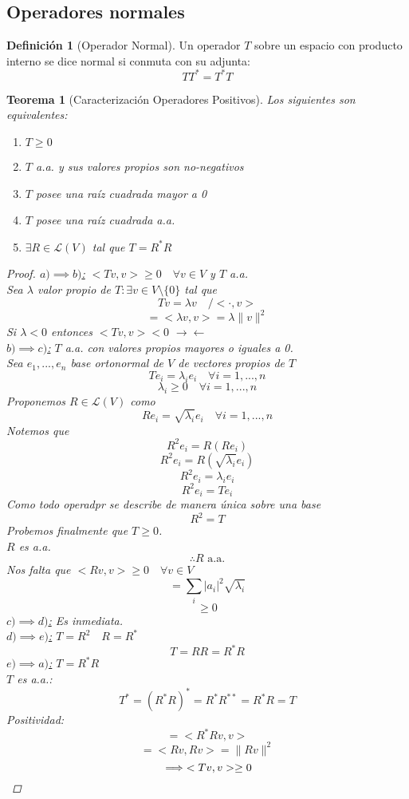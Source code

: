 \documentclass[11pt]{book}
\newcommand{\contr}{\rightarrow\leftarrow}
\newtheorem{thm}{Teorema}[section]
\theoremstyle{definition}
\newtheorem{defn}{Definición}[section]
\begin{document}
\subsection{Operadores normales}
\begin{defn}[Operador Normal]
	Un operador $T$ sobre un espacio con producto interno se dice normal si conmuta con su adjunta:
	\[TT^*=T^*T\]
\end{defn}
\begin{thm}[Caracterización Operadores Positivos]
	Los siguientes son equivalentes:
	\begin{enumerate}[label=\alph*)]
		\item $T\geq 0$

		\item $T$ a.a. y sus valores propios son no-negativos

		\item $T$ posee una raíz cuadrada mayor a 0

		\item $T$ posee una raíz cuadrada a.a.

		\item $\exists R\in\mathcal{L}(V)$ tal que $T=R^*R$
	\end{enumerate}
	\begin{proof}
		\underline{$a)\implies b)$:} $<Tv,v>\geq 0\quad\forall v\in V$ y $T$ a.a.\\
		Sea $\lambda$ valor propio de $T:\exists v\in V\setminus\{0\}$ tal que
		\[Tv=\lambda v\quad/<\cdot,v>\]
		\[<Tv,v>=<\lambda v,v>=\lambda \|v\|^2\]
		Si $\lambda<0$ entonces $<Tv,v><0$ $\contr$\\
		\underline{$b)\implies c)$:} $T$ a.a. con valores propios mayores o iguales a 0.\\
		Sea $e_1,...,e_n$ base ortonormal de $V$ de vectores propios de $T$
		\[Te_i=\lambda_ie_i\quad\forall i=1,...,n\]
		\[\lambda_i\geq 0\quad\forall i=1,...,n\]
		Proponemos $R\in\mathcal{L}(V)$ como
		\[Re_i=\sqrt{\lambda_i}e_i\quad\forall i=1,...,n\]
		Notemos que
		\[R^2e_i=R(Re_i)\]
		\[R^2e_i=R(\sqrt{\lambda_i}e_i)\]
		\[R^2e_i=\lambda_ie_i\]
		\[R^2e_i=Te_i\]
		Como todo operadpr se describe de manera única sobre una base
		\[R^2=T\]
		Probemos finalmente que $T\geq 0$.\\
		$R$ es a.a.
		\[\therefore R\textrm{ a.a.}\]
		Nos falta que $<Rv,v>\geq 0\quad\forall v\in V$
		\[<Rv,v>=\sum_i |a_i|^2\sqrt{\lambda_i}\]
		\[<Rv,v>\geq 0\]
		\underline{$c)\implies d)$:} Es inmediata.\\
		\underline{$d)\implies e)$:} $T=R^2\quad R=R^*$
		\[T=RR=R^*R\]
		\underline{$e)\implies a)$:} $T=R^*R$\\
		$T$ es a.a.:
		\[T^*=(R^*R)^*=R^*R^{**}=R^*R=T\]
		Positividad:
		\[<Tv,v>=<R^*Rv,v>\]
		\[<Tv,v>=<Rv,Rv>=\|Rv\|^2\]
		\[\implies <Tv,v>\geq 0\qedhere\]
	\end{proof}
\end{thm}
\end{document}
